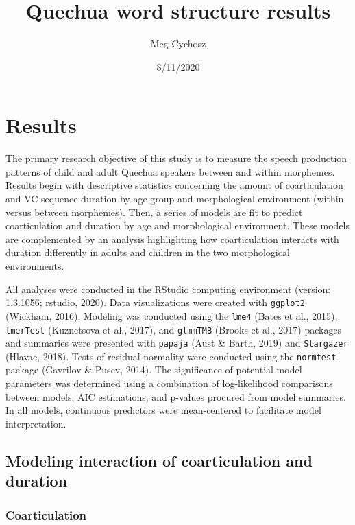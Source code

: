 \documentclass[
]{article}
\title{Quechua word structure results}
\author{Meg Cychosz}
\date{8/11/2020}
\begin{document}
\maketitle

{
\setcounter{tocdepth}{2}
\tableofcontents
}
\hypertarget{results}{%
\section{Results}\label{results}}

The primary research objective of this study is to measure the speech production patterns of child and adult Quechua speakers between and within morphemes. Results begin with descriptive statistics concerning the amount of coarticulation and VC sequence duration by age group and morphological environment (within versus between morphemes). Then, a series of models are fit to predict coarticulation and duration by age and morphological environment. These models are complemented by an analysis highlighting how coarticulation interacts with duration differently in adults and children in the two morphological environments.

All analyses were conducted in the RStudio computing environment (version: 1.3.1056; rstudio, 2020). Data visualizations were created with \texttt{ggplot2} (Wickham, 2016). Modeling was conducted using the \texttt{lme4} (Bates et al., 2015), \texttt{lmerTest} (Kuznetsova et al., 2017), and \texttt{glmmTMB} (Brooks et al., 2017) packages and summaries were presented with \texttt{papaja} (Aust \& Barth, 2019) and \texttt{Stargazer} (Hlavac, 2018). Tests of residual normality were conducted using the \texttt{normtest} package (Gavrilov \& Pusev, 2014). The significance of potential model parameters was determined using a combination of log-likelihood comparisons between models, AIC estimations, and p-values procured from model summaries. In all models, continuous predictors were mean-centered to facilitate model interpretation.

\hypertarget{modeling-interaction-of-coarticulation-and-duration}{%
\subsection{Modeling interaction of coarticulation and duration}\label{modeling-interaction-of-coarticulation-and-duration}}

\hypertarget{coarticulation}{%
\subsubsection{Coarticulation}\label{coarticulation}}
\end{document}

